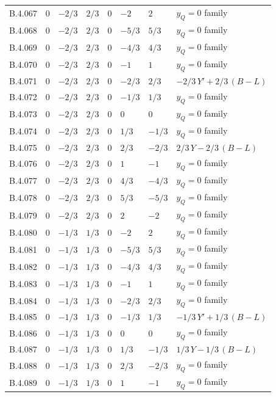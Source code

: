 {\begin{longtable}{@{}lllllll>{\raggedright\arraybackslash}p{5.6cm}@{}}
B.4.067 & $0$ & $-2/3$ & $2/3$ & $0$ & $-2$ & $2$ & $y_Q=0$ family \\
B.4.068 & $0$ & $-2/3$ & $2/3$ & $0$ & $-5/3$ & $5/3$ & $y_Q=0$ family \\
B.4.069 & $0$ & $-2/3$ & $2/3$ & $0$ & $-4/3$ & $4/3$ & $y_Q=0$ family \\
B.4.070 & $0$ & $-2/3$ & $2/3$ & $0$ & $-1$ & $1$ & $y_Q=0$ family \\
B.4.071 & $0$ & $-2/3$ & $2/3$ & $0$ & $-2/3$ & $2/3$ & $-2/3\,Y'+2/3\,(B{-}L)$ \\
B.4.072 & $0$ & $-2/3$ & $2/3$ & $0$ & $-1/3$ & $1/3$ & $y_Q=0$ family \\
B.4.073 & $0$ & $-2/3$ & $2/3$ & $0$ & $0$ & $0$ & $y_Q=0$ family \\
B.4.074 & $0$ & $-2/3$ & $2/3$ & $0$ & $1/3$ & $-1/3$ & $y_Q=0$ family \\
B.4.075 & $0$ & $-2/3$ & $2/3$ & $0$ & $2/3$ & $-2/3$ & $2/3\,Y-2/3\,(B{-}L)$ \\
B.4.076 & $0$ & $-2/3$ & $2/3$ & $0$ & $1$ & $-1$ & $y_Q=0$ family \\
B.4.077 & $0$ & $-2/3$ & $2/3$ & $0$ & $4/3$ & $-4/3$ & $y_Q=0$ family \\
B.4.078 & $0$ & $-2/3$ & $2/3$ & $0$ & $5/3$ & $-5/3$ & $y_Q=0$ family \\
B.4.079 & $0$ & $-2/3$ & $2/3$ & $0$ & $2$ & $-2$ & $y_Q=0$ family \\
B.4.080 & $0$ & $-1/3$ & $1/3$ & $0$ & $-2$ & $2$ & $y_Q=0$ family \\
B.4.081 & $0$ & $-1/3$ & $1/3$ & $0$ & $-5/3$ & $5/3$ & $y_Q=0$ family \\
B.4.082 & $0$ & $-1/3$ & $1/3$ & $0$ & $-4/3$ & $4/3$ & $y_Q=0$ family \\
B.4.083 & $0$ & $-1/3$ & $1/3$ & $0$ & $-1$ & $1$ & $y_Q=0$ family \\
B.4.084 & $0$ & $-1/3$ & $1/3$ & $0$ & $-2/3$ & $2/3$ & $y_Q=0$ family \\
B.4.085 & $0$ & $-1/3$ & $1/3$ & $0$ & $-1/3$ & $1/3$ & $-1/3\,Y'+1/3\,(B{-}L)$ \\
B.4.086 & $0$ & $-1/3$ & $1/3$ & $0$ & $0$ & $0$ & $y_Q=0$ family \\
B.4.087 & $0$ & $-1/3$ & $1/3$ & $0$ & $1/3$ & $-1/3$ & $1/3\,Y-1/3\,(B{-}L)$ \\
B.4.088 & $0$ & $-1/3$ & $1/3$ & $0$ & $2/3$ & $-2/3$ & $y_Q=0$ family \\
B.4.089 & $0$ & $-1/3$ & $1/3$ & $0$ & $1$ & $-1$ & $y_Q=0$ family \\

\end{longtable}}
